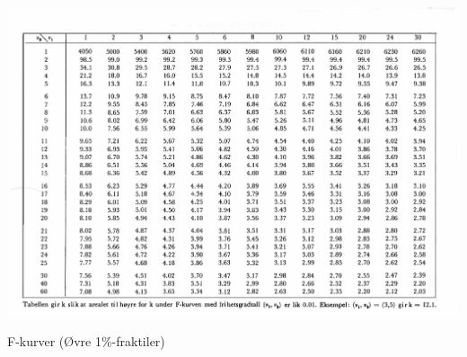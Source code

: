 \begin{table}[H]
\centering
  \includegraphics[scale=0.8]{figurer/Tabell_7b_F_kurver_Fraktiler_1_prosent.pdf}
 \caption{F-kurver (Øvre 1\%-fraktiler)}
 \label{tab:F_kurver_Fraktiler_1_prosent} %
\end{table}

